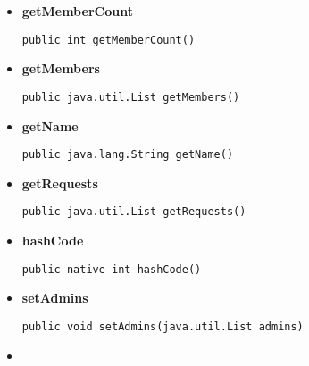 \documentclass[11pt,a4paper]{report}
\begin{document}
{{{{{{\begin{itemize}
{\begin{lstlisting}[frame=none]
public java.lang.String getImagePath()\end{lstlisting} %
}%
\item{ 
\hypertarget{edu.kit.pse17.go_app.PersistenceLayer.GroupEntity.getMemberCount()}{{\bf  getMemberCount}\\}
\begin{lstlisting}[frame=none]
public int getMemberCount()\end{lstlisting} %
}%
\item{ 
\hypertarget{edu.kit.pse17.go_app.PersistenceLayer.GroupEntity.getMembers()}{{\bf  getMembers}\\}
\begin{lstlisting}[frame=none]
public java.util.List getMembers()\end{lstlisting} %
}%
\item{ 
\hypertarget{edu.kit.pse17.go_app.PersistenceLayer.GroupEntity.getName()}{{\bf  getName}\\}
\begin{lstlisting}[frame=none]
public java.lang.String getName()\end{lstlisting} %
}%
\item{ 
\hypertarget{edu.kit.pse17.go_app.PersistenceLayer.GroupEntity.getRequests()}{{\bf  getRequests}\\}
\begin{lstlisting}[frame=none]
public java.util.List getRequests()\end{lstlisting} %
}%
\item{ 
\hypertarget{edu.kit.pse17.go_app.PersistenceLayer.GroupEntity.hashCode()}{{\bf  hashCode}\\}
\begin{lstlisting}[frame=none]
public native int hashCode()\end{lstlisting} %
}%
\item{ 
\hypertarget{edu.kit.pse17.go_app.PersistenceLayer.GroupEntity.setAdmins(java.util.List)}{{\bf  setAdmins}\\}
\begin{lstlisting}[frame=none]
public void setAdmins(java.util.List admins)\end{lstlisting} %
}%
\item{ 
}
\end{itemize}}}}}}}
\end{document}
